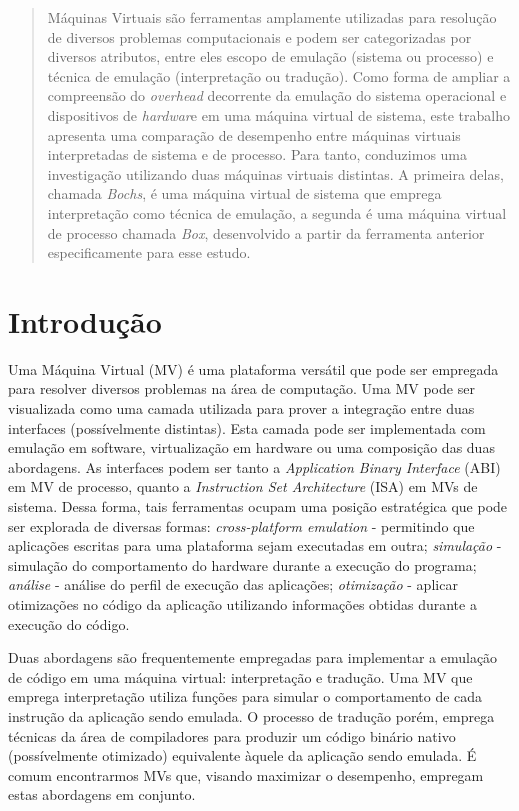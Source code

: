 \documentclass[11pt,twoside]{article}
\begin{document}
\begin{abstract} 
Máquinas Virtuais são ferramentas amplamente utilizadas para resolução de 
diversos problemas computacionais e podem ser categorizadas por diversos atributos, 
entre eles escopo de emulação (sistema ou processo) e técnica de emulação 
(interpretação ou tradução). Como forma de ampliar a compreensão do \emph{overhead} 
decorrente da emulação do sistema operacional e dispositivos de \emph{hardwar}e em uma
máquina virtual de sistema, este trabalho apresenta uma comparação de 
desempenho entre máquinas virtuais interpretadas de sistema e de processo.
Para tanto, conduzimos uma investigação utilizando duas máquinas virtuais distintas. 
A primeira delas, chamada \emph{Bochs}, é uma máquina virtual de sistema que 
emprega interpretação como técnica de emulação, a segunda é uma máquina virtual 
de processo chamada \emph{Box}, desenvolvido a partir da ferramenta anterior 
especificamente para esse estudo.
\end{abstract}

\section{Introdução}
Uma Máquina Virtual (MV) é uma plataforma versátil que pode ser empregada para resolver diversos problemas na área de computação. 
Uma MV pode ser visualizada como uma camada utilizada para prover a integração entre duas interfaces (possívelmente distintas). Esta camada pode ser implementada com emulação em software, virtualização em hardware ou uma composição das duas abordagens.
As interfaces podem ser tanto a \emph{Application Binary Interface} (ABI) em MV de processo, quanto a \emph{Instruction Set Architecture} (ISA) em MVs de sistema.
Dessa forma, tais ferramentas ocupam uma posição estratégica que pode ser explorada de diversas formas:
\textit{cross-platform emulation} - permitindo que aplicações escritas para uma plataforma sejam executadas em outra; 
\textit{simulação} - simulação do comportamento do hardware durante a execução do programa; \textit{análise} - análise do
perfil de execução das aplicações; \textit{otimização} - aplicar otimizações no código da aplicação utilizando informações
obtidas durante a execução do código.  

Duas abordagens são frequentemente empregadas para implementar a emulação de código em uma máquina virtual: interpretação e tradução.
Uma MV que emprega interpretação utiliza funções para simular o comportamento de cada instrução da aplicação sendo emulada. 
O processo de tradução porém, emprega técnicas da área de compiladores para produzir um código binário nativo (possívelmente otimizado) equivalente àquele da aplicação sendo emulada.
É comum encontrarmos MVs que, visando maximizar o desempenho, empregam estas abordagens em conjunto.
\end{document}
